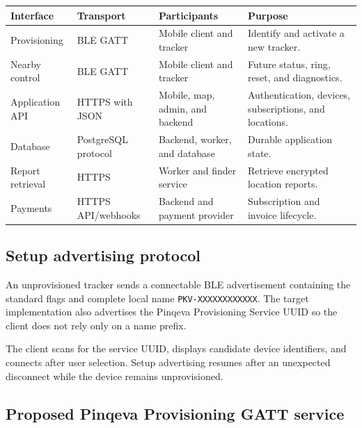 \documentclass[12pt,a4paper]{article}
\newcommand{\code}[1]{\texttt{#1}}
\begin{document}
\begin{table}[ht]
    \centering
    \small
    \begin{tabularx}{\textwidth}{p{2.6cm}p{2.6cm}p{4.0cm}X}
        \toprule
        \textbf{Interface} & \textbf{Transport} &
        \textbf{Participants} & \textbf{Purpose} \\
        \midrule
        Provisioning &
        BLE GATT &
        Mobile client and tracker &
        Identify and activate a new tracker. \\
        Nearby control &
        BLE GATT &
        Mobile client and tracker &
        Future status, ring, reset, and diagnostics. \\
        Application API &
        HTTPS with JSON &
        Mobile, map, admin, and backend &
        Authentication, devices, subscriptions, and locations. \\
        Database &
        PostgreSQL protocol &
        Backend, worker, and database &
        Durable application state. \\
        Report retrieval &
        HTTPS &
        Worker and finder service &
        Retrieve encrypted location reports. \\
        Payments &
        HTTPS API/webhooks &
        Backend and payment provider &
        Subscription and invoice lifecycle. \\
        \bottomrule
    \end{tabularx}
\end{table}

\subsection{Setup advertising protocol}

An unprovisioned tracker sends a connectable BLE advertisement containing the
standard flags and complete local name \code{PKV-XXXXXXXXXXXX}. The target
implementation also advertises the Pinqeva Provisioning Service UUID so the
client does not rely only on a name prefix.

The client scans for the service UUID, displays candidate device identifiers,
and connects after user selection. Setup advertising resumes after an
unexpected disconnect while the device remains unprovisioned.

\subsection{Proposed Pinqeva Provisioning GATT service}
\end{document}
